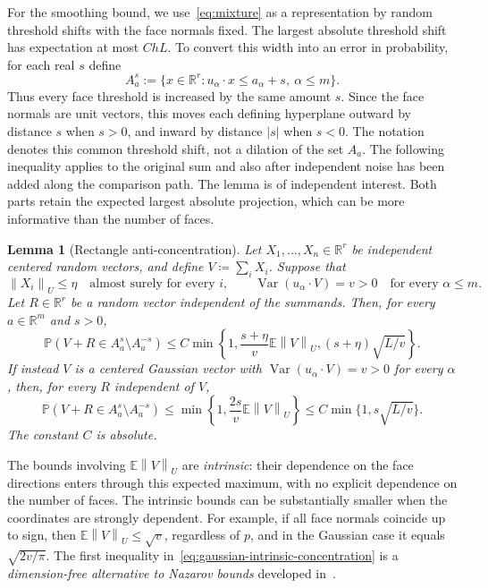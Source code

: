 \documentclass[11pt,letterpaper]{article}
\newtheorem{lemma}{Lemma}
\theoremstyle{remark}
\newcommand{\E}{\mathbb E}
\newcommand{\Pp}{\mathbb P}
\newcommand{\R}{\mathbb R}
\newcommand{\Var}{\operatorname{Var}}
\newcommand{\norm}[1]{\left\lVert#1\right\rVert}
\begin{document}
For the smoothing bound, we use~\eqref{eq:mixture} as a representation
by random threshold shifts with the face normals fixed.
The largest absolute threshold shift has expectation at most \(ChL\).
{
To convert this width into an error in probability, for each real \(s\) define
\[
 A_a^s:=\{x\in\R^r:u_\alpha\cdot x\le a_\alpha+s,\ \alpha\le m\}.
\]
Thus every face threshold is increased by the same amount \(s\).
Since the face normals are unit vectors, this moves each defining
hyperplane outward by distance \(s\) when \(s>0\), and inward by
distance \(|s|\) when \(s<0\). The notation denotes this common
threshold shift, not a dilation of the set \(A_a\).} The following inequality applies to the original sum and
also after independent noise has been added along the comparison path.
The lemma is of independent interest. Both parts retain the expected
largest absolute projection, which can be more informative than the
number of faces.

\begin{lemma}[Rectangle anti-concentration]\label{lem:concentration}
Let \(X_1,\ldots,X_n\in\R^r\) be independent centered random
vectors, and {define} \(V\coloneqq\sum_iX_i\). Suppose that
\[
 \norm{X_i}_U\le\eta\quad\text{almost surely for every }i,
 \qquad \Var(u_\alpha\cdot V)=v>0
                   \quad\text{for every }\alpha\le m.
\]
Let \(R\in\R^r\) be a random vector independent of the summands.
Then, for every \(a\in\R^m\) and \(s>0\),
\begin{equation}
 \Pp(V+R\in A_a^s\setminus A_a^{-s})
 \le C\min\left\{1,\frac{s+\eta}{v}\E\norm{V}_U,
                         (s+\eta)\sqrt{L/v}\right\}.
 \label{eq:bounded-intrinsic-concentration}
\end{equation}
If instead \(V\) is a centered Gaussian vector with
\(\Var(u_\alpha\cdot V)=v>0\) for every \(\alpha\), then, for
every \(R\) independent of \(V\),
\begin{equation}
 \Pp(V+R\in A_a^s\setminus A_a^{-s})
 \le\min\left\{1,\frac{2s}{v}\E\norm{V}_U\right\}
 \le C\min\{1,s\sqrt{L/v}\}.
 \label{eq:gaussian-intrinsic-concentration}
\end{equation}
The constant \(C\) is absolute.
\end{lemma}
The bounds involving \(\E\norm{V}_U\) are \emph{intrinsic}:
their dependence on the face directions enters through this expected
maximum, with no explicit dependence on the number of faces.
{The intrinsic bounds can be substantially smaller when the
coordinates are strongly dependent. For example, if all face normals
coincide up to sign}, then
\(\E\norm{V}_U\le\sqrt v\), regardless of \(p\), and in the
Gaussian case it equals \(\sqrt{2v/\pi}\).
The first inequality in~\eqref{eq:gaussian-intrinsic-concentration}
is a \emph{dimension-free alternative to Nazarov bounds} {developed in~\cite{ChernozhukovAC2026}.}
\end{document}
